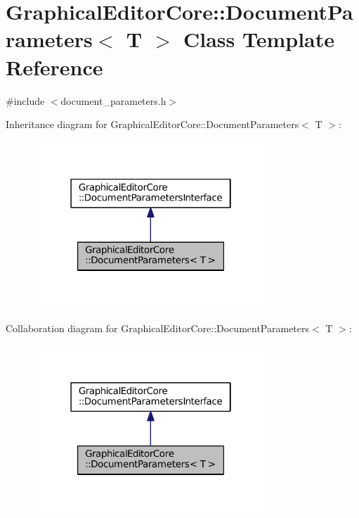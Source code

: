 \hypertarget{classGraphicalEditorCore_1_1DocumentParameters}{}\section{Graphical\+Editor\+Core\+:\+:Document\+Parameters$<$ T $>$ Class Template Reference}
\label{classGraphicalEditorCore_1_1DocumentParameters}


{\ttfamily \#include $<$document\+\_\+parameters.\+h$>$}



Inheritance diagram for Graphical\+Editor\+Core\+:\+:Document\+Parameters$<$ T $>$\+:
\nopagebreak
\begin{figure}[H]
\begin{center}
\leavevmode
\includegraphics[width=250pt]{classGraphicalEditorCore_1_1DocumentParameters__inherit__graph}
\end{center}
\end{figure}


Collaboration diagram for Graphical\+Editor\+Core\+:\+:Document\+Parameters$<$ T $>$\+:
\nopagebreak
\begin{figure}[H]
\begin{center}
\leavevmode
\includegraphics[width=250pt]{classGraphicalEditorCore_1_1DocumentParameters__coll__graph}
\end{center}
\end{figure}
